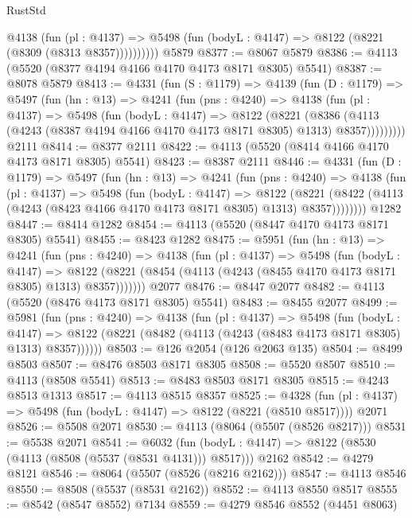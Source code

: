 \begin{lexlean}{RustStd}
\begin{coremodule}
            @4138
              (fun (pl : @4137) =>
              @5498 (fun (bodyL : @4147) => @8122 (@8221 (@8309 (@8313 @8357))))))))))
    @5879
@8377 := @8067 @5879
@8386 := @4113 (@5520 (@8377 @4194 @4166 @4170 @4173 @8171 @8305) @5541)
@8387 := @8078 @5879
@8413 := @4331
    (fun (S : @1179) =>
    @4139
      (fun (D : @1179) =>
      @5497
        (fun (hn : @13) =>
        @4241
          (fun (pns : @4240) =>
          @4138
            (fun (pl : @4137) =>
            @5498
              (fun (bodyL : @4147) =>
              @8122
                (@8221
                  (@8386
                    (@4113 (@4243 (@8387 @4194 @4166 @4170 @4173 @8171 @8305) @1313) @8357)))))))))
    @2111
@8414 := @8377 @2111
@8422 := @4113 (@5520 (@8414 @4166 @4170 @4173 @8171 @8305) @5541)
@8423 := @8387 @2111
@8446 := @4331
    (fun (D : @1179) =>
    @5497
      (fun (hn : @13) =>
      @4241
        (fun (pns : @4240) =>
        @4138
          (fun (pl : @4137) =>
          @5498
            (fun (bodyL : @4147) =>
            @8122
              (@8221 (@8422 (@4113 (@4243 (@8423 @4166 @4170 @4173 @8171 @8305) @1313) @8357))))))))
    @1282
@8447 := @8414 @1282
@8454 := @4113 (@5520 (@8447 @4170 @4173 @8171 @8305) @5541)
@8455 := @8423 @1282
@8475 := @5951
    (fun (hn : @13) =>
    @4241
      (fun (pns : @4240) =>
      @4138
        (fun (pl : @4137) =>
        @5498
          (fun (bodyL : @4147) =>
          @8122 (@8221 (@8454 (@4113 (@4243 (@8455 @4170 @4173 @8171 @8305) @1313) @8357)))))))
    @2077
@8476 := @8447 @2077
@8482 := @4113 (@5520 (@8476 @4173 @8171 @8305) @5541)
@8483 := @8455 @2077
@8499 := @5981
    (fun (pns : @4240) =>
    @4138
      (fun (pl : @4137) =>
      @5498
        (fun (bodyL : @4147) =>
        @8122 (@8221 (@8482 (@4113 (@4243 (@8483 @4173 @8171 @8305) @1313) @8357))))))
@8503 := @126 @2054 (@126 @2063 @135)
@8504 := @8499 @8503
@8507 := @8476 @8503 @8171 @8305
@8508 := @5520 @8507
@8510 := @4113 (@8508 @5541)
@8513 := @8483 @8503 @8171 @8305
@8515 := @4243 @8513 @1313
@8517 := @4113 @8515 @8357
@8525 := @4328
    (fun (pl : @4137) => @5498 (fun (bodyL : @4147) => @8122 (@8221 (@8510 @8517))))
    @2071
@8526 := @5508 @2071
@8530 := @4113 (@8064 (@5507 (@8526 @8217)))
@8531 := @5538 @2071
@8541 := @6032
    (fun (bodyL : @4147) => @8122 (@8530 (@4113 (@8508 (@5537 (@8531 @4131))) @8517)))
    @2162
@8542 := @4279 @8121
@8546 := @8064 (@5507 (@8526 (@8216 @2162)))
@8547 := @4113 @8546
@8550 := @8508 (@5537 (@8531 @2162))
@8552 := @4113 @8550 @8517
@8555 := @8542 (@8547 @8552) @7134
@8559 := @4279 @8546 @8552 (@4451 @8063)

\end{coremodule}
\end{lexlean}

